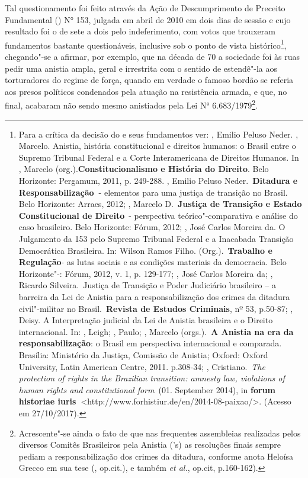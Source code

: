 Tal questionamento foi feito através da Ação de Descumprimento de
Preceito Fundamental () N° 153, julgada em abril de 2010 em dois
dias de sessão e cujo resultado foi o de sete a dois pelo indeferimento,
com votos que trouxeram fundamentos bastante questionáveis, inclusive
sob o ponto de vista histórico\footnote{Para a crítica da decisão do 
  e seus fundamentos ver: , Emilio Peluso Neder. , Marcelo.
  Anistia, história constitucional e direitos humanos: o Brasil entre o
  Supremo Tribunal Federal e a Corte Interamericana de Direitos Humanos.
  In , Marcelo (org.).\textbf{Constitucionalismo e História do
  Direito}. Belo Horizonte: Pergamum, 2011, p. 249-288. , Emilio
  Peluso Neder.~\textbf{Ditadura e Responsabilização~}- elementos para
  uma justiça de transição no Brasil. Belo Horizonte: Arraes, 2012;
  , Marcelo D.~\textbf{Justiça de Transição e Estado
  Constitucional de Direito}~- perspectiva teórico"-comparativa e análise
  do caso brasileiro. Belo Horizonte: Fórum, 2012;  , José
  Carlos Moreira da. O Julgamento da  153 pelo Supremo Tribunal
  Federal e a Inacabada Transição Democrática Brasileira. In: Wilson
  Ramos Filho. (Org.).~\textbf{Trabalho e Regulação}- as lutas sociais e
  as condições materiais da democracia. Belo Horizonte"-: Fórum, 2012,
  v. 1, p. 129-177;  , José Carlos Moreira da; , Ricardo
  Silveira.~Justiça de Transição e Poder Judiciário brasileiro -- a
  barreira da Lei de Anistia para a responsabilização dos crimes da
  ditadura civil"-militar no Brasil.~\textbf{Revista de Estudos
  Criminais}, nº 53, p.50-87; , Deisy. A Interpretação judicial da
  Lei de Anistia brasileira e o Direito internacional. In: , Leigh;
  , Paulo; , Marcelo (orgs.).~\textbf{A Anistia na era da
  responsabilização}: o Brasil em perspectiva internacional e comparada.
  Brasília: Ministério da Justiça, Comissão de Anistia; Oxford: Oxford
  University, Latin American Centre, 2011. p.308-34; ,
  Cristiano.~\emph{The protection of rights in the Brazilian transition:
  amnesty law, violations of human rights and constitutional form}~(01.
  September 2014), in \textbf{forum historiae
  iuris~}\textless{}http://www.forhistiur.de/en/2014-08-paixao/\textgreater{}.
  (Acesso em 27/10/2017).}, chegando"-se a afirmar, por exemplo, que na
década de 70 a sociedade foi às ruas pedir uma anistia ampla, geral e
irrestrita com o sentido de estendê"-la aos torturadores do regime de
força, quando em verdade o famoso bordão se referia aos presos políticos
condenados pela atuação na resistência armada, e que, no final, acabaram
não sendo mesmo anistiados pela Lei N° 6.683/1979\footnote{Acrescente"-se
  ainda o fato de que nas frequentes assembleias realizadas pelos
  diversos Comitês Brasileiros pela Anistia ('s) as resoluções finais
  sempre pediam a responsabilização dos crimes da ditadura, conforme
  anota Heloísa Grecco em sua tese (, op.cit.), e também 
  \emph{et al.}, op.cit, p.160-162).}.

